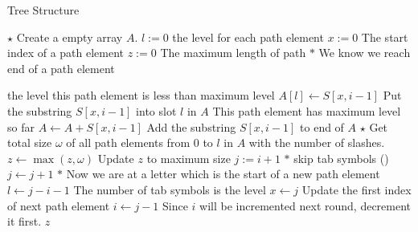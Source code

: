 \setcounter{algorithm}{0}
\begin{algorithm}[H]
\caption{Tree Structure}
\begin{algorithmic}[1]
\State $\star$ Create a empty array $A$.
\State $l:=0$ \Comment the level for each path element
\State $x:=0$ \Comment The start index of a path element
\State $z:=0$ \Comment The maximum length of path
\State $\ast$ We know we reach end of a path element
\end{algorithmic}
\end{algorithm}
\begin{algorithm}[H]
\begin{algorithmic}[1]
 \Comment the level this path element is less than maximum level
\State $A[l]\gets S[x,i-1]$ \Comment Put the substring $S[x,i-1]$ into slot $l$ in $A$
\Else \Comment This path element has maximum level so far
\State $A\gets A + S[x,i-1]$ \Comment Add the substring $S[x,i-1]$ to end of $A$
\EndIf 
{}
\State $\star$ Get total size $\omega$ of all path elements from $0$ to $l$ in $A$ with the number of slashes.
\State $z\gets \max(z,\omega)$ \Comment Update $z$ to maximum size
\EndIf
\State $j:=i+1$
\State $\ast$ skip tab symbols (\path{\t})
\State $j\gets j+1$
\EndWhile
\State $\ast$ Now we are at a letter which is the start of a new path element
\State $l\gets j-i-1$ \Comment The number of tab symbols is the level
\State $x\gets j$ \Comment Update the first index of next path element
\State $i\gets j-1$ \Comment Since $i$ will be incremented next round, decrement it first.
\EndIf
\EndFor
\State \Return $z$
\EndProcedure
\end{algorithmic}
\end{algorithm}

